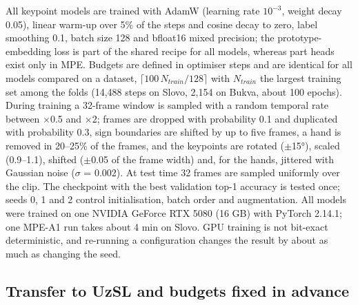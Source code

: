 \documentclass[a4paper,fleqn]{cas-dc}
\begin{document}
All keypoint models are trained with AdamW (learning rate \(10^{-3}\), weight decay 0.05), linear warm-up over 5\% of the steps and cosine decay to zero, label smoothing 0.1, batch size 128 and bfloat16 mixed precision; the prototype-embedding loss is part of the shared recipe for all models, whereas part heads exist only in MPE. Budgets are defined in optimiser steps and are identical for all models compared on a dataset, \(\lceil 100\,N_{train}/128 \rceil\) with \(N_{train}\) the largest training set among the folds (14,488 steps on Slovo, 2,154 on Bukva, about 100 epochs). During training a 32-frame window is sampled with a random temporal rate between $\times$0.5 and $\times$2; frames are dropped with probability 0.1 and duplicated with probability 0.3, sign boundaries are shifted by up to five frames, a hand is removed in 20--25\% of the frames, and the keypoints are rotated ($\pm$15°), scaled (0.9--1.1), shifted ($\pm$0.05 of the frame width) and, for the hands, jittered with Gaussian noise (\(\sigma\) = 0.002). At test time 32 frames are sampled uniformly over the clip. The checkpoint with the best validation top-1 accuracy is tested once; seeds 0, 1 and 2 control initialisation, batch order and augmentation. All models were trained on one NVIDIA GeForce RTX 5080 (16 GB) with PyTorch 2.14.1; one MPE-A1 run takes about 4 min on Slovo. GPU training is not bit-exact deterministic, and re-running a configuration changes the result by about as much as changing the seed.

\hypertarget{transfer-to-uzsl-and-budgets-fixed-in-advance}{%
\subsection{Transfer to UzSL and budgets fixed in advance}\label{transfer-to-uzsl-and-budgets-fixed-in-advance}}
\end{document}
